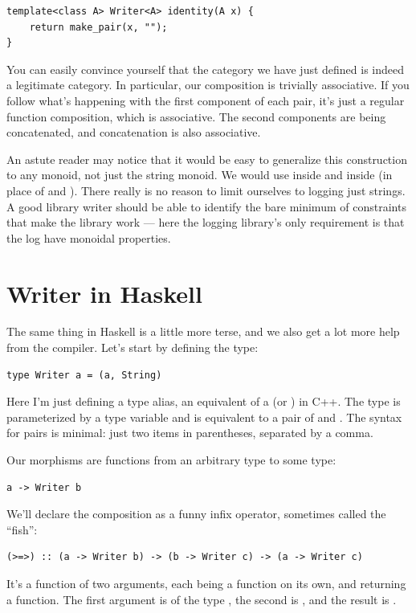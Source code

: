 \begin{Verbatim}
template<class A> Writer<A> identity(A x) {
    return make_pair(x, "");
}
\end{Verbatim}
You can easily convince yourself that the category we have just defined
is indeed a legitimate category. In particular, our composition is
trivially associative. If you follow what's happening with the first
component of each pair, it's just a regular function composition, which
is associative. The second components are being concatenated, and
concatenation is also associative.

An astute reader may notice that it would be easy to generalize this
construction to any monoid, not just the string monoid. We would use
 inside  and  inside
 (in place of \code{+} and ). There really
is no reason to limit ourselves to logging just strings. A good library
writer should be able to identify the bare minimum of constraints that
make the library work --- here the logging library's only requirement is
that the log have monoidal properties.

\section{Writer in Haskell}

The same thing in Haskell is a little more terse, and we also get a lot
more help from the compiler. Let's start by defining the 
type:

\begin{Verbatim}
type Writer a = (a, String)
\end{Verbatim}
Here I'm just defining a type alias, an equivalent of a 
(or ) in C++. The type  is parameterized by
a type variable  and is equivalent to a pair of  and
. The syntax for pairs is minimal: just two items in
parentheses, separated by a comma.

Our morphisms are functions from an arbitrary type to some
 type:

\begin{Verbatim}
a -> Writer b
\end{Verbatim}
We'll declare the composition as a funny infix operator, sometimes
called the ``fish'':

\begin{Verbatim}
(>=>) :: (a -> Writer b) -> (b -> Writer c) -> (a -> Writer c)
\end{Verbatim}
It's a function of two arguments, each being a function on its own, and
returning a function. The first argument is of the type
, the second is
, and the result is
.

